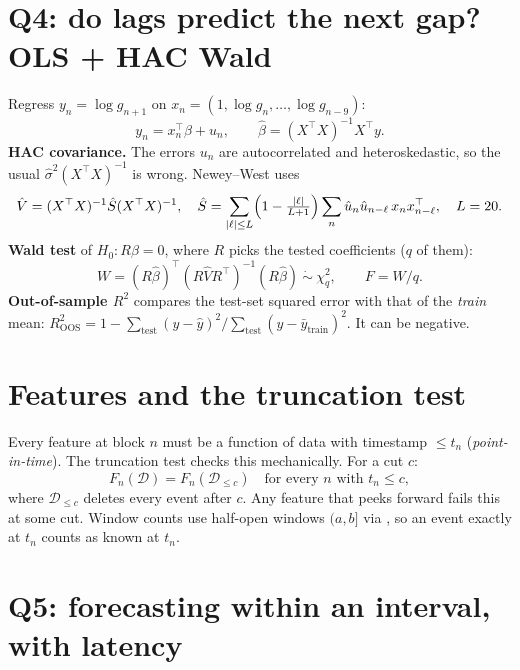 \documentclass[11pt,a4paper]{article}
\newcommand{\code}[1]{\texttt{\detokenize{#1}}}
\begin{document}
\section{Q4: do lags predict the next gap? OLS + HAC Wald}
Regress $y_n=\log g_{n+1}$ on $x_n=(1,\log g_n,\dots,\log g_{n-9})$:
\begin{equation}
  y_n = x_n^\top\beta + u_n,\qquad \hat\beta=(X^\top X)^{-1}X^\top y .
\end{equation}
\textbf{HAC covariance.} The errors $u_n$ are autocorrelated and heteroskedastic, so the usual $\hat\sigma^2(X^\top X)^{-1}$ is wrong. Newey--West uses
\begin{equation}
  \hat V = (X^\top X)^{-1}\hat S(X^\top X)^{-1},\quad
  \hat S=\sum_{|\ell|\le L}\Bigl(1-\tfrac{|\ell|}{L+1}\Bigr)\sum_n \hat u_n\hat u_{n-\ell}\,x_nx_{n-\ell}^\top,\quad L=20 .
\end{equation}
\textbf{Wald test} of $H_0: R\beta=0$, where $R$ picks the tested coefficients ($q$ of them):
\begin{equation}
  W=(R\hat\beta)^\top(R\hat VR^\top)^{-1}(R\hat\beta)\ \dot\sim\ \chi^2_q,\qquad F=W/q .
\end{equation}
\textbf{Out-of-sample $R^2$} compares the test-set squared error with that of the \emph{train} mean:
$R^2_{\text{OOS}}=1-\sum_{\text{test}}(y-\hat y)^2\big/\sum_{\text{test}}(y-\bar y_{\text{train}})^2$. It can be negative.

\section{Features and the truncation test}
Every feature at block $n$ must be a function of data with timestamp $\le t_n$ (\emph{point-in-time}). The truncation test checks this mechanically. For a cut $c$:
\begin{equation}
  F_n(\mathcal D)=F_n(\mathcal D_{\le c})\quad\text{for every } n \text{ with } t_n\le c,
\end{equation}
where $\mathcal D_{\le c}$ deletes every event after $c$. Any feature that peeks forward fails this at some cut. Window counts use half-open windows $(a,b]$
via \code{searchsorted}, so an event exactly at $t_n$ counts as known at $t_n$.

\section{Q5: forecasting within an interval, with latency}
\end{document}
